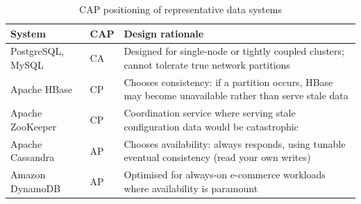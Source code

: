 \begin{table}[h!t]
\centering
\caption{CAP positioning of representative data systems}
\label{tab:cap-systems}
\renewcommand{\arraystretch}{1.4}
\begin{tabular}{L{2.8cm} C{0.8cm} L{5.4cm}}
\toprule
\textbf{System} & \textbf{CAP} & \textbf{Design rationale} \\
\midrule
PostgreSQL, MySQL & CA & Designed for single-node or tightly coupled clusters;
                         cannot tolerate true network partitions \\
Apache HBase      & CP & Chooses consistency: if a partition occurs, HBase may
                         become unavailable rather than serve stale data \\
Apache ZooKeeper  & CP & Coordination service where serving stale configuration
                         data would be catastrophic \\
Apache Cassandra  & AP & Chooses availability: always responds, using
                         tunable eventual consistency (read your own writes) \\
Amazon DynamoDB   & AP & Optimised for always-on e-commerce workloads where
                         availability is paramount \\
\bottomrule
\end{tabular}
\end{table}

